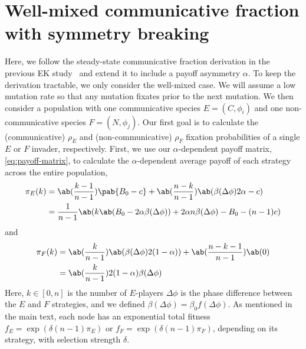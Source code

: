 \section{Well-mixed communicative fraction with symmetry breaking}\label{sec:analytic_comm_frac}
Here, we follow the steady-state communicative fraction derivation
in the previous EK study~\citep{tripp2022evolutionary}
and extend it to include a payoff asymmetry $\alpha$.
To keep the derivation tractable,
we only consider the well-mixed case.
We will assume a low mutation rate
so that any mutation fixates prior to the next mutation.
We then consider a population with one communicative species $E = (C, \phi_i)$
and one non-communicative species $F = (N, \phi_j)$.
Our first goal is to calculate
the (communicative) $\rho_E$ and (non-communicative) $\rho_F$
fixation probabilities of a single $E$ or $F$ invader, respectively.
First, we use our $\alpha$-dependent payoff matrix, \cref{eq:payoff-matrix},
to calculate the $\alpha$-dependent average payoff
of each strategy across the entire population,
\begin{align}
  \pi_E(k) &= \ab(\frac{k-1}{n-1}) \pab{B_0 - c}
                + \ab(\frac{n-k}{n-1}) \ab(\beta(\Delta\phi) 2\alpha - c) \\
           &= \frac{1}{n-1}
               \ab(k \ab(B_0 - 2 \alpha \beta(\Delta\phi))
                 + 2 \alpha n \beta(\Delta\phi) - B_0 - (n-1) c)
\end{align}
and
\begin{align}
  \pi_F(k) &= \ab(\frac{k}{n-1}) \ab(\beta(\Delta\phi) 2 (1-\alpha))
                + \ab(\frac{n-k-1}{n-1}) \ab(0) \\
           &= \ab(\frac{k}{n-1}) 2 (1-\alpha) \beta(\Delta\phi)
\end{align}
Here, $k \in [0,n]$ is the number of $E$-players
$\Delta \phi$ is the phase difference between the $E$ and $F$
strategies,
and we defined $\beta(\Delta \phi) = \beta_0 f(\Delta \phi)$.
As mentioned in the main text,
each node has an exponential total fitness
$f_E = \exp(\delta (n-1) \pi_E)$
or
$f_F = \exp(\delta (n-1) \pi_F)$,
depending on its strategy,
with selection strength $\delta$.

